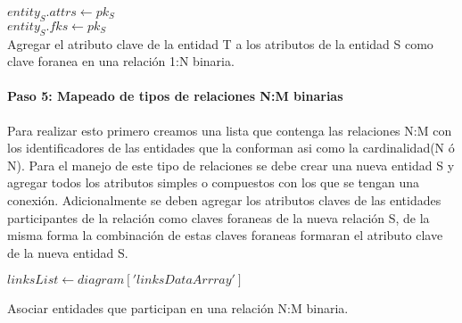 \begin{algorithm}[H]

    \ForEach{$relation \in relations1\_1:$}{
      \If{$(link['cardinality'] = N :$}{
        $entity_S \gets entiesWithAttrs[relationKey$\\
      }
      \If{$(link['cardinality'] = 1 :$}{
        $entity_T \gets entiesWithAttrs[relationKey$\\
      }
    }
    $entity_S.attrs \gets pk_S$\\
    $entity_S.fks \gets pk_S$\\
  \caption{Agregar el atributo clave de la entidad T a los atributos de la entidad S como clave foranea en una relación 1:N binaria.}
\end{algorithm}

\paragraph*{Paso 5: Mapeado de tipos de relaciones N:M binarias}

Para realizar esto primero creamos una lista que contenga las relaciones N:M con los identificadores de las entidades que la conforman asi como la cardinalidad(N ó N). Para el manejo de este tipo de relaciones se debe crear una nueva entidad S y agregar todos los atributos simples o compuestos con los que se tengan una conexión. Adicionalmente se deben agregar los atributos claves de las entidades participantes de la relación como claves foraneas de la nueva relación S, de la misma forma la combinación de estas claves foraneas formaran el atributo clave de la nueva entidad S.

\begin{algorithm}[H]

  $linksList \gets diagram['linksDataArrray']$\\
  \caption{Asociar entidades que participan en una relación N:M binaria.}
\end{algorithm}

